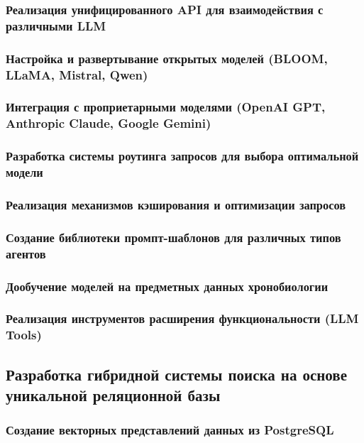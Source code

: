 \documentclass{syksu-coursework}
\begin{document}
\subsubsection{Реализация унифицированного API для взаимодействия с различными LLM}

\subsubsection{Настройка и развертывание открытых моделей (BLOOM, LLaMA, Mistral, Qwen)}

\subsubsection{Интеграция с проприетарными моделями (OpenAI GPT, Anthropic Claude, Google Gemini)}

\subsubsection{Разработка системы роутинга запросов для выбора оптимальной модели}

\subsubsection{Реализация механизмов кэширования и оптимизации запросов}

\subsubsection{Создание библиотеки промпт-шаблонов для различных типов агентов}

\subsubsection{Дообучение моделей на предметных данных хронобиологии}

\subsubsection{Реализация инструментов расширения функциональности (LLM Tools)}

\subsection{Разработка гибридной системы поиска на основе уникальной реляционной базы}

\subsubsection{Создание векторных представлений данных из PostgreSQL}
\end{document}
